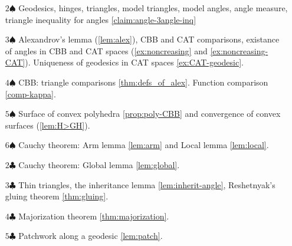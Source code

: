 \begin{itemize}
\item[$2\spadesuit$] Geodesics, hinges, triangles, model triangles, model angles, angle measure, triangle inequality for angles \ref{claim:angle-3angle-inq}
\vskip1.1mm
\item[$3\spadesuit$] Alexandrov's lemma (\ref{lem:alex}), CBB and CAT comparisons,
existance of angles in CBB and CAT spaces (\ref{ex:noncreasing} and \ref{ex:noncreasing-CAT}).
Uniqueness of geodesics in CAT spaces \ref{ex:CAT-geodesic}.
\vskip1.1mm
\item[$4\spadesuit$] CBB: triangle comparisons \ref{thm:defs_of_alex}. Function comparison \ref{comp-kappa}.
\vskip1.1mm
\item[$5\spadesuit$] Surface of convex polyhedra \ref{prop:poly-CBB} and convergence of convex surfaces (\ref{lem:H>GH}).
\vskip1.1mm
\item[$6\spadesuit$] Cauchy theorem: Arm lemma \ref{lem:arm} and Local lemma \ref{lem:local}.
\vskip1.1mm
\item[$2\clubsuit$] Cauchy theorem: Global lemma \ref{lem:global}.
\vskip1.1mm
\item[$3\clubsuit$] Thin triangles, the inheritance lemma \ref{lem:inherit-angle}, Reshetnyak's gluing theorem \ref{thm:gluing}.
\vskip1.1mm
\item[$4\clubsuit$] Majorization theorem \ref{thm:majorization}.
\vskip1.1mm
\item[$5\clubsuit$] Patchwork along a geodesic \ref{lem:patch}.

\end{itemize}
